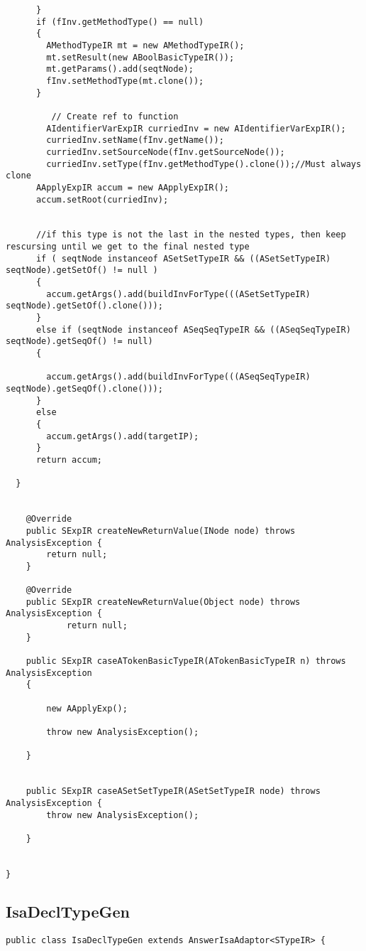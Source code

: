 \begin{appendices}
\begin{lstlisting}
      }
      if (fInv.getMethodType() == null)
      {
        AMethodTypeIR mt = new AMethodTypeIR();
        mt.setResult(new ABoolBasicTypeIR());
        mt.getParams().add(seqtNode);
        fInv.setMethodType(mt.clone());
      }
      
         // Create ref to function
        AIdentifierVarExpIR curriedInv = new AIdentifierVarExpIR();
        curriedInv.setName(fInv.getName());
        curriedInv.setSourceNode(fInv.getSourceNode());
        curriedInv.setType(fInv.getMethodType().clone());//Must always clone
      AApplyExpIR accum = new AApplyExpIR();
      accum.setRoot(curriedInv);
      
      
      //if this type is not the last in the nested types, then keep rescursing until we get to the final nested type
      if ( seqtNode instanceof ASetSetTypeIR && ((ASetSetTypeIR) seqtNode).getSetOf() != null )
      {
        accum.getArgs().add(buildInvForType(((ASetSetTypeIR) seqtNode).getSetOf().clone()));
      }
      else if (seqtNode instanceof ASeqSeqTypeIR && ((ASeqSeqTypeIR) seqtNode).getSeqOf() != null)
      {
        
        accum.getArgs().add(buildInvForType(((ASeqSeqTypeIR) seqtNode).getSeqOf().clone()));
      }
      else
      {
        accum.getArgs().add(targetIP);
      }
      return accum;
        
  }


    @Override
    public SExpIR createNewReturnValue(INode node) throws AnalysisException {
        return null;
    }

    @Override
    public SExpIR createNewReturnValue(Object node) throws AnalysisException {
            return null;
    }

    public SExpIR caseATokenBasicTypeIR(ATokenBasicTypeIR n) throws AnalysisException
    {

        new AApplyExp();

        throw new AnalysisException();

    }


    public SExpIR caseASetSetTypeIR(ASetSetTypeIR node) throws AnalysisException {
        throw new AnalysisException();

    }


}
\end{lstlisting}

\subsection{IsaDeclTypeGen} \label{IsaDeclTypeGenafter}
\begin{lstlisting}
public class IsaDeclTypeGen extends AnswerIsaAdaptor<STypeIR> {


\end{lstlisting}
\end{appendices}
